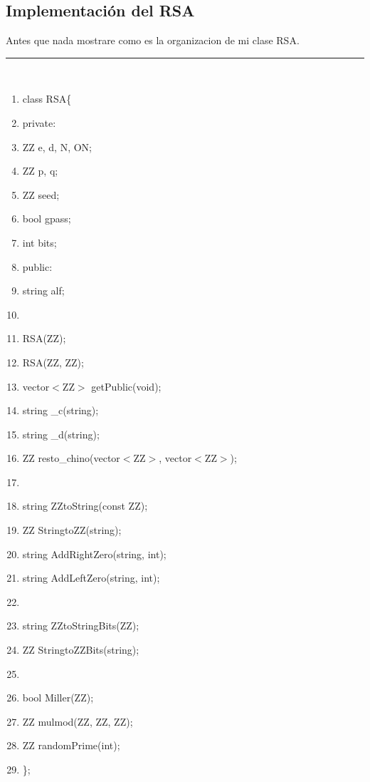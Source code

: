 \documentclass[11pt, conference]{IEEEtran}
\begin{document}
\subsection{Implementación del RSA}
Antes que nada mostrare como es la organizacion de mi clase RSA.\\
\rule[0mm]{181mm}{0.1mm}\\
\begin{enumerate}
	\item class RSA\{
	\item \qquad private:
	\item \qquad\qquad ZZ e, d, N, ON;
	\item \qquad\qquad ZZ p, q;
	\item \qquad\qquad ZZ seed;
	\item \qquad\qquad bool gpass;
	\item \qquad\qquad int bits;
	\item \qquad public:
	\item \qquad\qquad string alf;
	\item 
	\item \qquad\qquad RSA(ZZ);
	\item \qquad\qquad RSA(ZZ, ZZ);
	\item \qquad\qquad vector$<$ZZ$>$ getPublic(void);
	\item \qquad\qquad string \_c(string);
	\item \qquad\qquad string \_d(string);
	\item \qquad\qquad ZZ resto\_chino(vector$<$ZZ$>$, vector$<$ZZ$>$);
	\item 	
	\item \qquad\qquad string ZZtoString(const ZZ);
	\item \qquad\qquad ZZ StringtoZZ(string);
	\item \qquad\qquad string AddRightZero(string, int);
	\item \qquad\qquad string AddLeftZero(string, int);	
	\item 	
	\item \qquad\qquad string ZZtoStringBits(ZZ);
	\item \qquad\qquad ZZ StringtoZZBits(string);
	\item 	
	\item \qquad\qquad bool Miller(ZZ);
	\item \qquad\qquad ZZ mulmod(ZZ, ZZ, ZZ);
	\item \qquad\qquad ZZ randomPrime(int);
	\item \};
\end{enumerate}
\end{document}
